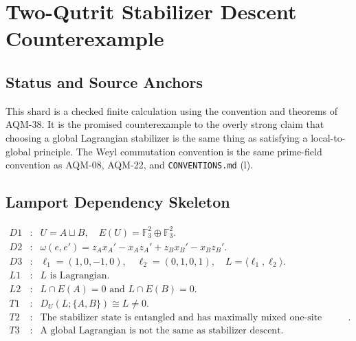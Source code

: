 
\section{Two-Qutrit Stabilizer Descent Counterexample}
\label{sec:two-qutrit-stabilizer-descent-counterexample}

\subsection{Status and Source Anchors}

This shard is a checked finite calculation using the convention and theorems
of AQM-38.  It is the promised counterexample to the overly strong claim that
choosing a global Lagrangian stabilizer is the same thing as satisfying a
local-to-global principle.  The Weyl commutation convention is the same
prime-field convention as AQM-08, AQM-22, and \texttt{CONVENTIONS.md} (l).

\subsection{Lamport Dependency Skeleton}

\[
\begin{array}{rcl}
D1&:&U=A\sqcup B,\quad E(U)=\mathbb F_3^2\oplus\mathbb F_3^2.\\
D2&:&\omega(e,e')=z_Ax_A'-x_Az_A'+z_Bx_B'-x_Bz_B'.\\
D3&:&\ell_1=(1,0,-1,0),\quad \ell_2=(0,1,0,1),\quad
      L=\langle\ell_1,\ell_2\rangle.\\
L1&:&L\text{ is Lagrangian}.\\
L2&:&L\cap E(A)=0\text{ and }L\cap E(B)=0.\\
T1&:&D_U(L;\{A,B\})\cong L\ne0.\\
T2&:&\text{The stabilizer state is entangled and has maximally mixed
      one-site marginals}.\\
T3&:&\text{A global Lagrangian is not the same as stabilizer descent.}
\end{array}
\]

